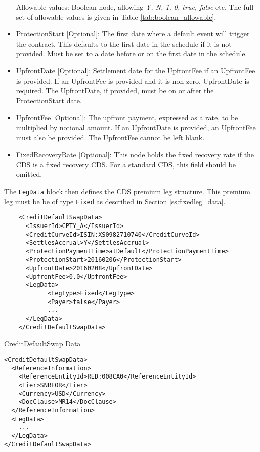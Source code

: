 \begin{itemize}
Allowable values: Boolean node, allowing \emph{Y, N, 1, 0, true, false} etc. The full set of allowable values is given in Table \ref{tab:boolean_allowable}.
  
\item ProtectionStart [Optional]: The first date where a default event will trigger the contract. This defaults to the first date in the schedule if it is not provided. Must be set to a date before or on the first date in the schedule.
\item UpfrontDate [Optional]: Settlement date for the UpfrontFee if an UpfrontFee is provided. If an UpfrontFee is provided and it is non-zero, UpfrontDate is required. The UpfrontDate, if provided, must be on or after the ProtectionStart date.
\item UpfrontFee [Optional]: The upfront payment, expressed as a rate, to be multiplied by notional amount. If an UpfrontDate is provided, an UpfrontFee must also be provided. The UpfrontFee cannot be left blank.
\item FixedRecoveryRate [Optional]: This node holds the fixed recovery rate if the CDS is a fixed recovery CDS. For a standard CDS, this field should be omitted.
\end{itemize}

The \lstinline!LegData! block then defines the CDS premium leg structure. This premium leg must be be of type \lstinline!Fixed! as described in Section \ref{ss:fixedleg_data}.

\begin{listing}[H]
\begin{verbatim}
    <CreditDefaultSwapData>
      <IssuerId>CPTY_A</IssuerId>
      <CreditCurveId>ISIN:XS0982710740</CreditCurveId>
      <SettlesAccrual>Y</SettlesAccrual>
      <ProtectionPaymentTime>atDefault</ProtectionPaymentTime>
      <ProtectionStart>20160206</ProtectionStart>
      <UpfrontDate>20160208</UpfrontDate>
      <UpfrontFee>0.0</UpfrontFee>
      <LegData>
            <LegType>Fixed</LegType>
            <Payer>false</Payer>
            ...
      </LegData>
    </CreditDefaultSwapData>
\end{verbatim}
\caption{CreditDefaultSwap Data}
\label{lst:cdsdata}
\end{listing}

\begin{listing}[H]
\begin{verbatim}
<CreditDefaultSwapData>
  <ReferenceInformation>
    <ReferenceEntityId>RED:008CA0</ReferenceEntityId>
    <Tier>SNRFOR</Tier>
    <Currency>USD</Currency>
    <DocClause>MR14</DocClause>
  </ReferenceInformation>
  <LegData>
    ...
  </LegData>
</CreditDefaultSwapData>
\end{verbatim}
\caption{\lstinline!CreditDefaultSwapData! with \lstinline!ReferenceInformation!}
\label{lst:cdsdata_with_ref_info}
\end{listing}
